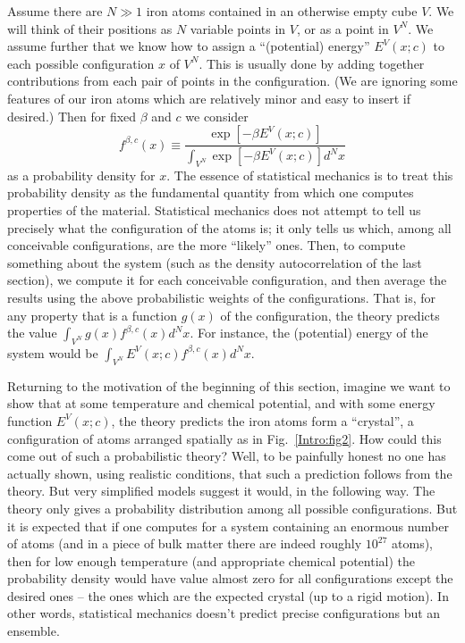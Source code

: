 \documentclass[reqno]{stml-l}
\theoremstyle{plain}
\theoremstyle{definition}
\numberwithin{equation}{chapter}
\begin{document}
Assume there are $N\gg 1$ iron atoms contained in an otherwise empty cube $V$. We will think of their positions as $N$ variable points in $V$, or as a point in $V^{N}$. We assume further that we know how to assign a ``(potential) energy'' $E^{V}(x;c)$ to each possible configuration $x$ of $V^{N}$. This is usually done by adding together contributions from each pair of points in the configuration. (We are ignoring some features of our iron atoms which are relatively minor and easy to insert if desired.) Then for fixed $\beta$ and $c$ we consider
\begin{equation}
f^{\beta,c}(x)\equiv\frac{\exp[-\beta E^{V}(x;c)]}{\int_{V^{N}}\exp[-\beta E^{V}(x;c)]d^{N}x}\label{ch02:eqn2.9}
\end{equation}
as a probability density for $x$. The essence of statistical mechanics is to treat this probability density as the fundamental quantity from which one computes properties of the material. Statistical mechanics does not attempt to tell us precisely what the configuration of the atoms is; it only tells us which, among all conceivable configurations, are the more ``likely'' ones. Then, to compute something about the system (such as the density autocorrelation of the last section), we compute it for each conceivable configuration, and then average the results using the above probabilistic weights of the configurations. That is, for any property that is a function $g(x)$ of the configuration, the theory predicts the value $\int_{V^{N}}g(x)f^{\beta,c}(x)d^{N}x$. For instance, the (potential) energy of the system would be $\int_{V^{N}}E^{V}(x;c)f^{\beta,c}(x)d^{N}x$.

Returning to the motivation of the beginning of this
section, imagine we want to show that at some temperature
and chemical potential, and with some energy function
$E^{V}(x;c)$, the theory predicts the iron atoms form a
``crystal'', a configuration of atoms arranged spatially as
in Fig.~\ref{Intro:fig2}. How could this come out of such a
probabilistic theory? Well, to be painfully honest no one
has actually shown, using realistic conditions, that such a
prediction follows from the theory. But very simplified
models suggest it would, in the following way. The theory
only gives a probability distribution among all possible
configurations. But it is expected that if one computes for
a system containing an enormous number of atoms (and in a
piece of bulk matter there are indeed roughly $10^{27}$
atoms), then for low enough temperature (and appropriate
chemical potential) the probability density would have
value almost zero for all configurations except the desired
ones -- the ones which are the expected crystal (up to a
rigid motion). In other words, statistical mechanics
doesn't predict precise configurations but an ensemble.
\end{document}
